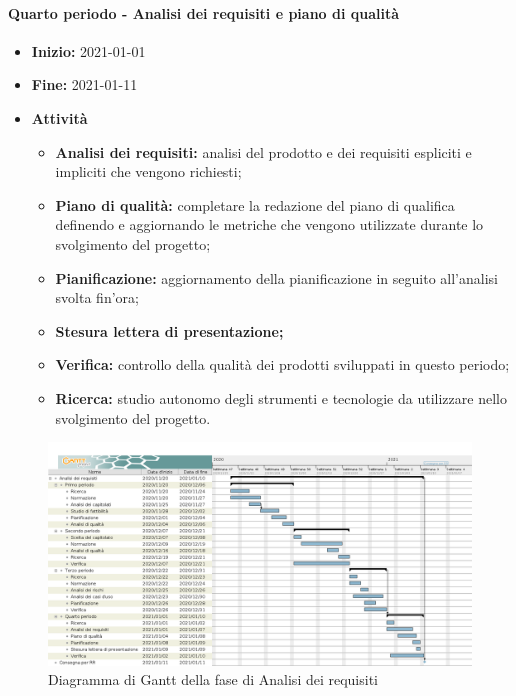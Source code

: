 \paragraph[Quarto periodo]{Quarto periodo - \textnormal{Analisi dei requisiti e piano di qualità}}
\begin{itemize}
    \item [] \textbf{Inizio:} 2021-01-01
    \item [] \textbf{Fine:} 2021-01-11
    \item [] \textbf{Attività}
          \begin{itemize}
              \item \textbf{Analisi dei requisiti:} analisi del prodotto e dei requisiti espliciti e impliciti che vengono richiesti;
              \item \textbf{Piano di qualità:} completare la redazione del piano di qualifica definendo e aggiornando le metriche che vengono utilizzate durante lo svolgimento del progetto;
              \item \textbf{Pianificazione:} aggiornamento della pianificazione in seguito all'analisi svolta fin'ora;
              \item \textbf{Stesura lettera di presentazione;}
              \item \textbf{Verifica:} controllo della qualità dei prodotti sviluppati in questo periodo;
              \item \textbf{Ricerca:} studio autonomo degli strumenti e tecnologie da utilizzare nello svolgimento del progetto.
          \end{itemize}
\end{itemize}
\begin{figure}[H]
    \centering
    \includegraphics[width=1\linewidth]{res/images/pianificazione/analisi_dei_requisiti.png}
    \caption{Diagramma di Gantt della fase di Analisi dei requisiti}
    \label{fig:_Gantt analisi dei requisiti}
\end{figure}

